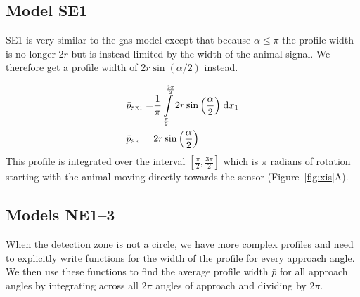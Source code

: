 \subsection{Model SE1} \label{SE1}
SE1 is very similar to the gas model except that because $\alpha \le \pi$ the profile width is no longer $2r$ but is instead limited by the width of the animal signal.
We therefore get a profile width of $2r\sin(\alpha/2)$ instead.

\begin{align}
    \bar{p}_{\text{\tiny{SE1}}} =&\frac{1}{\pi} \int\limits_{\frac{\pi}{2}}^{\frac{3 \pi}{2}}2 r \sin{\left (\frac{\alpha}{2} \right )}\;\mathrm{d}x_{1}\label{pSE1Def}\\
    \bar{p}_{\text{\tiny{SE1}}}  =& 2 r \sin{\left (\frac{\alpha}{2} \right )}\label{pSE1Sln}
\end{align}
This profile is integrated over the interval $[\frac{\pi}{2}, \frac{3\pi}{2}]$ which is $\pi$ radians of rotation starting with the animal moving directly towards the sensor (Figure~\ref{fig:xis}A).

\subsection{Models NE1--3} \label{NE}

When the detection zone is not a circle, we have more complex profiles  and need to explicitly write functions for the width of the profile for every approach angle.
We then use these functions to find the average profile width $\bar{p}$ for all approach angles by integrating across all $2\pi$ angles of approach and dividing by $2\pi$.




